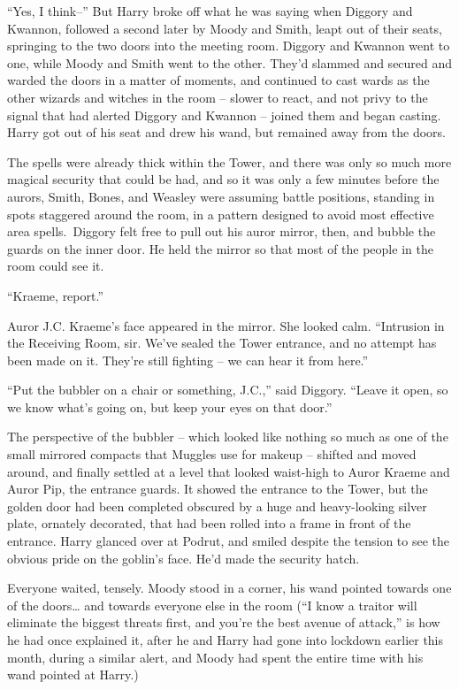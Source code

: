 ``Yes, I think--'' But Harry broke off what he was saying when Diggory
and Kwannon, followed a second later by Moody and Smith, leapt out of
their seats, springing to the two doors into the meeting room. Diggory
and Kwannon went to one, while Moody and Smith went to the other. They'd
slammed and secured and warded the doors in a matter of moments, and
continued to cast wards as the other wizards and witches in the room --
slower to react, and not privy to the signal that had alerted Diggory
and Kwannon -- joined them and began casting. Harry got out of his seat
and drew his wand, but remained away from the doors.

The spells were already thick within the Tower, and there was only so
much more magical security that could be had, and so it was only a few
minutes before the aurors, Smith, Bones, and Weasley were assuming
battle positions, standing in spots staggered around the room, in a
pattern designed to avoid most effective area spells.~Diggory felt free
to pull out his auror mirror, then, and bubble the guards on the inner
door. He held the mirror so that most of the people in the room could
see it.

``Kraeme, report.''

Auror J.C. Kraeme's face appeared in the mirror. She looked calm.
``Intrusion in the Receiving Room, sir. We've sealed the Tower entrance,
and no attempt has been made on it. They're still fighting -- we can
hear it from here.''

``Put the bubbler on a chair or something, J.C.,'' said Diggory. ``Leave
it open, so we know what's going on, but keep your eyes on that door.''

The perspective of the bubbler -- which looked like nothing so much as
one of the small mirrored compacts that Muggles use for makeup --
shifted and moved around, and finally settled at a level that looked
waist-high to Auror Kraeme and Auror Pip, the entrance guards. It showed
the entrance to the Tower, but the golden door had been completed
obscured by a huge and heavy-looking silver plate, ornately decorated,
that had been rolled into a frame in front of the entrance. Harry
glanced over at Podrut, and smiled despite the tension to see the
obvious pride on the goblin's face. He'd made the security hatch.

Everyone waited, tensely. Moody stood in a corner, his wand pointed
towards one of the doors\ldots{} and towards everyone else in the room
(``I know a traitor will eliminate the biggest threats first, and you're
the best avenue of attack,'' is how he had once explained it, after he
and Harry had gone into lockdown earlier this month, during a similar
alert, and Moody had spent the entire time with his wand pointed at
Harry.)


